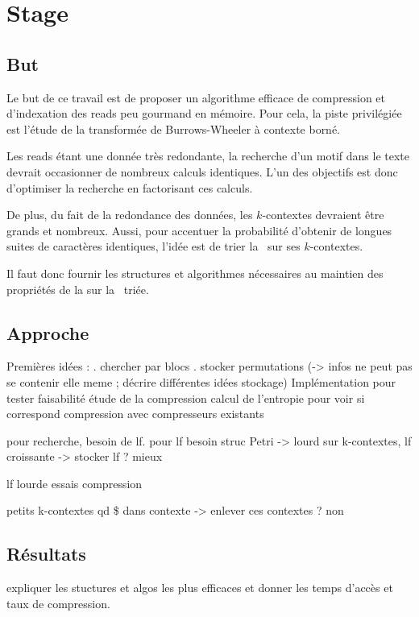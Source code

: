 \section{Stage}

\subsection{But}
Le but de ce travail est de proposer un algorithme efficace de compression et d'indexation des reads peu gourmand en mémoire. Pour cela, la piste privilégiée est l'étude de la transformée de Burrows-Wheeler à contexte borné. 

Les reads étant une donnée très redondante, la recherche d'un motif dans le texte devrait occasionner de nombreux calculs identiques. L'un des objectifs est donc d'optimiser la recherche en factorisant ces calculs. 

De plus, du fait de la redondance des données, les $k$-contextes devraient être grands et nombreux. Aussi, pour accentuer la probabilité d'obtenir de longues suites de caractères identiques, l'idée est de trier la \kbwt\ sur ses $k$-contextes. 

Il faut donc fournir les structures et algorithmes nécessaires au maintien des propriétés de la \bwt sur la \kbwt \ triée.


\subsection{Approche}
Premières idées :
	. chercher par blocs
	. stocker permutations (-> infos ne peut pas se contenir elle meme ; décrire différentes idées stockage)
Implémentation pour tester faisabilité
étude de la compression
calcul de l'entropie pour voir si correspond
compression avec compresseurs existants

pour recherche, besoin de lf. pour lf besoin struc Petri -> lourd
sur k-contextes, lf croissante -> stocker lf ? mieux

lf lourde
essais compression

petits k-contextes qd \$ dans contexte -> enlever ces contextes ?
non

\subsection{Résultats} 

expliquer les stuctures et algos les plus efficaces et donner les temps d'accès et taux de compression.
